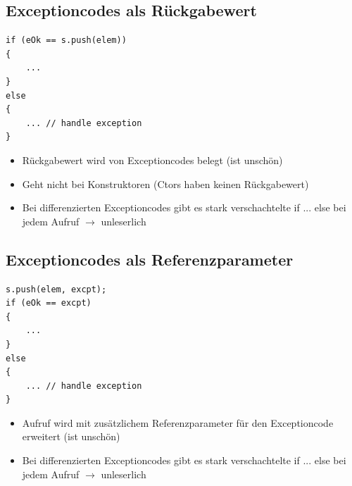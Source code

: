 \subsection{Exceptioncodes als Rückgabewert}
\begin{multicols}{2}
\begin{minipage}{\linewidth}
\vspace{-2\baselineskip}
\begin{lstlisting}
if (eOk == s.push(elem))
{
	...
}
else
{
	... // handle exception
}
\end{lstlisting}
\end{minipage}
\vfill\null
\columnbreak
\begin{itemize}
	\item Rückgabewert wird von Exceptioncodes belegt (ist unschön)
	\item Geht nicht bei Konstruktoren (Ctors haben keinen Rückgabewert)
	\item Bei differenzierten Exceptioncodes gibt es stark verschachtelte if ... else bei jedem Aufruf $\rightarrow$ unleserlich
\end{itemize}
\end{multicols}

\subsection{Exceptioncodes als Referenzparameter}
\begin{multicols}{2}
\begin{minipage}{\linewidth}
	\vspace{-2\baselineskip}
\begin{lstlisting}
s.push(elem, excpt);
if (eOk == excpt)
{
	...
}
else
{
	... // handle exception
}
\end{lstlisting}
\end{minipage}
\vfill\null
\columnbreak
\begin{itemize}
	\item Aufruf wird mit zusätzlichem Referenzparameter für den Exceptioncode erweitert (ist unschön)
	\item Bei differenzierten Exceptioncodes gibt es stark verschachtelte if ... else bei jedem Aufruf $\rightarrow$ unleserlich	
\end{itemize}
\end{multicols}
\vfill
\pagebreak\newpage

